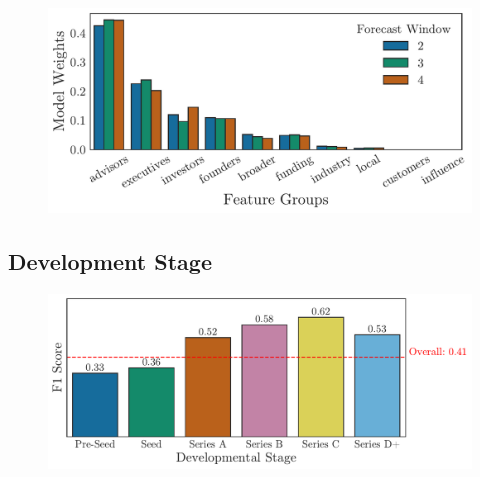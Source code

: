 \documentclass[../thesis/thesis.tex]{subfiles}
\begin{document}
\begin{table}[!htb]
    \centering
    \scalebox{0.9}{}
    \caption[Classification report by forecast window]{}
    \label{fig:evaluation:clf_report_window}
\end{table}

\begin{figure}[!htb]
    \centering
    \includegraphics[width=\textwidth]{../figures/evaluation/feature_groups_window}
    \caption[Grouped feature weights by forecast window]{}
    \label{fig:evaluation:feature_groups_window}
\end{figure}

\subsection{Development Stage}


\begin{figure}[!htb]
    \centering
    \includegraphics[width=\textwidth]{../figures/evaluation/predictive_stage}
    \caption[F1 Scores by developmental stage]{}
    \label{fig:evaluation:f1_predictive_stage}
\end{figure}

\begin{table}[!htb]
    \centering
    \scalebox{0.9}{}
    \caption[Classification report by developmental stage]{}
    \label{fig:evaluation:clf_report_stage}
\end{table}
\end{document}
